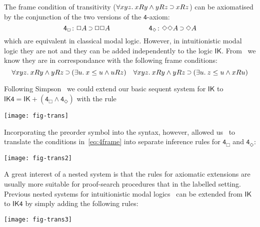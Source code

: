 \documentclass[twoside]{aiml20}
\newcommand*{\ax}[1]{\mathsf{#1}}
\newcommand*{\AND}{\mathbin{\wedge}}
\newcommand*{\IMP}{\mathbin{\scalebox{.9}{\raise.2ex\hbox{$\supset$}}}}
\newcommand*{\BOX}{\mathord{\Box}}
\newcommand*{\DIA}{\mathord{\Diamond}}
\newcommand*{\IK}{\mathsf{IK}}
\newcommand*{\lb}[1]{#1}%
\newcommand*{\fm}[1]{#1}%
\newcommand*{\accs}[2]{\lb{#1}R\lb{#2}}
\newcommand*{\futs}[2]{\lb{#1}\le{\lb{#2}}}
\begin{document}
The frame condition of transitivity ($\forall \lb {xyz}.\:\accs xy\AND \accs yz\IMP\accs xz$) can be axiomatised by the conjunction of the two versions of the $\ax 4$-axiom:\vspace*{-.2cm}
$$\small
\ax{4_{\BOX}}\colon\fm{\BOX A\IMP \BOX\BOX A}
\qquad\qquad\qquad
\ax{4_{\DIA}}\colon\fm{\DIA\DIA A\IMP\DIA A}
$$
%
which are equivalent in classical modal logic. 
%
However, in intuitionistic modal logic they are not and they can be added independently to the logic $\IK$. %
%
From~\cite{plotkin1986} we know they are in correspondance with the following frame conditions:\vspace*{-.2cm}
{\small
\begin{equation}
\label{eq:4frame}
\forall\lb{xyz}.\:\accs xy\AND \accs yz\IMP(\exists\lb{u}.\:\futs x{u}\AND\accs {u}z)
\quad
\forall\lb{xyz}.\:\accs xy\AND \accs yz\IMP(\exists\lb{u}.\:\futs z{u}\AND\accs {x}{u})
\end{equation}
}

Following Simpson~\cite{simpson1994} we could extend our basic sequent system for $\IK$ to $\mathsf{IK4} = \IK+(\ax{4_{\BOX}}\AND\ax{4_{\DIA}})$ with the rule%

\begin{center}
\texttt{[image: fig-trans]}
\end{center}

Incorporating the preorder symbol into the syntax, however,  allowed us~\cite{marin:morales:strassburger:hal} to 
translate the conditions in~\eqref{eq:4frame} into separate inference rules for $\ax{4_{\BOX}}$ and $\ax{4_{\DIA}}$:%

\begin{center}
	\texttt{[image: fig-trans2]}
\end{center}

A great interest of a nested system is that the rules for axiomatic extensions are usually more suitable for proof-search procedures that in the labelled setting.
%
Previous nested systems for intuitionistic modal logics~\cite{strassburger2013,kuznets:strassburger:maehara} can be extended from $\IK$ to $\mathsf{IK4}$ by simply adding the following rules:%

\begin{center}
	\texttt{[image: fig-trans3]}
\end{center}
\end{document}
